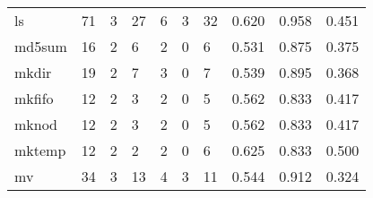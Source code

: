 \begin{longtable}{lp{1.3cm}p{1.3cm}p{1.3cm}p{1.3cm}p{1.3cm}p{1.3cm}p{1.3cm}p{1.3cm}p{1.3cm}}
ls        &                     71 &                                             3 &                                           27 &                                           6 &                                            3 &                                         32 &                                0.620 &                                  0.958 &                                0.451 \\
md5sum    &                     16 &                                             2 &                                            6 &                                           2 &                                            0 &                                          6 &                                0.531 &                                  0.875 &                                0.375 \\
mkdir     &                     19 &                                             2 &                                            7 &                                           3 &                                            0 &                                          7 &                                0.539 &                                  0.895 &                                0.368 \\
mkfifo    &                     12 &                                             2 &                                            3 &                                           2 &                                            0 &                                          5 &                                0.562 &                                  0.833 &                                0.417 \\
mknod     &                     12 &                                             2 &                                            3 &                                           2 &                                            0 &                                          5 &                                0.562 &                                  0.833 &                                0.417 \\
mktemp    &                     12 &                                             2 &                                            2 &                                           2 &                                            0 &                                          6 &                                0.625 &                                  0.833 &                                0.500 \\
mv        &                     34 &                                             3 &                                           13 &                                           4 &                                            3 &                                         11 &                                0.544 &                                  0.912 &                                0.324 \\

\end{longtable}
